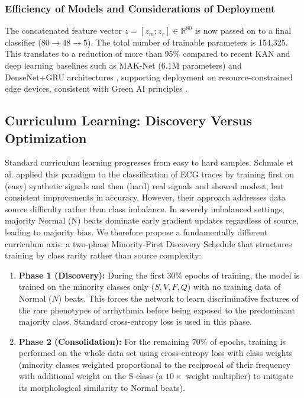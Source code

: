 \documentclass[journal,twoside,web]{ieeecolor}
\begin{document}
\subsubsection{Efficiency of Models and Considerations of Deployment}
The concatenated feature vector $z = [z_m; z_r] \in \mathbb{R}^{80}$ is now passed on to a final classifier ($80 \to 48 \to 5$). The total number of trainable parameters is 154,325. This translates to a reduction of more than 95\% compared to recent KAN and deep learning baselines such as MAK-Net (6.1M parameters) \cite{zhao_mak-net_2025} and DenseNet+GRU architectures \cite{guo_inter-patient_2019}, supporting deployment on resource-constrained edge devices, consistent with Green AI principles \cite{elsheikhy_lightweight_2025}.

\subsection{Curriculum Learning: Discovery Versus Optimization}
Standard curriculum learning progresses from easy to hard samples. Schmale et al. \cite{schmale_curriculum_2025} applied this paradigm to the classification of ECG traces by training first on (easy) synthetic signals and then (hard) real signals and showed modest, but consistent improvements in accuracy. However, their approach addresses data source difficulty rather than class imbalance. In severely imbalanced settings, majority Normal (N) beats dominate early gradient updates regardless of source, leading to majority bias. We therefore propose a fundamentally different curriculum axis: a two-phase Minority-First Discovery Schedule that structures training by class rarity rather than source complexity:

\begin{enumerate}
    \item \textbf{Phase 1 (Discovery):} During the first 30\% epochs of training, the model is trained on the minority classes only ($S, V, F, Q$) with no training data of Normal ($N$) beats. This forces the network to learn discriminative features of the rare phenotypes of arrhythmia before being exposed to the predominant majority class. Standard cross-entropy loss is used in this phase.
    
    \item \textbf{Phase 2 (Consolidation):} For the remaining 70\% of epochs, training is performed on the whole data set using cross-entropy loss with class weights (minority classes weighted proportional to the reciprocal of their frequency with additional weight on the S-class (a $10\times$ weight multiplier) to mitigate its morphological similarity to Normal beats).
\end{enumerate}
\end{document}
